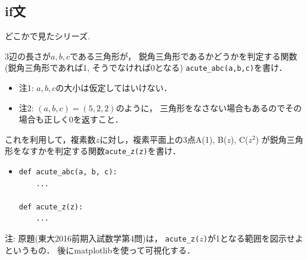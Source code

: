 \documentclass[10pt,dvipdfmx]{article}
\begin{document}
\subsection{{\scriptsize if文}}
どこかで見たシリーズ.

3辺の長さが$a, b, c$である三角形が，
鋭角三角形であるかどうかを判定する関数
(鋭角三角形であれば1, そうでなければ0となる)
{\tt acute\_abc(a,b,c)}を書け．
\begin{itemize}
\item 注1: $a, b, c$の大小は仮定してはいけない．
\item 注2: $(a,b,c) = (5, 2, 2)$のように，
三角形をなさない場合もあるのでその場合も正しく0を返すこと．
\end{itemize}

これを利用して，複素数$z$に対し，複素平面上の3点A(1), B($z$), C($z^2$)
が鋭角三角形をなすかを判定する関数{\tt acute\_z(z)}を書け．

\begin{itemize}
\item []
\begin{lstlisting}
def acute_abc(a, b, c):
    ...  

def acute_z(z):
    ...  
\end{lstlisting}
\end{itemize}

{\footnotesize 注: 原題(東大2016前期入試数学第4問)は，
{\tt acute\_z($z$)}が1となる範囲を図示せよというもの．
後にmatplotlibを使って可視化する．}

\end{document}
